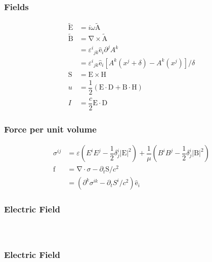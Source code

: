 \documentclass[xcolor=dvipsnames]{beamer}
\renewcommand{\c}{\cdot} %
\newcommand{\f}[2]{\dfrac{#1}{#2}} %
\newcommand{\p}[1]{\left(#1\right)} %
\renewcommand{\sp}[1]{\left[#1\right]} %
\newcommand{\abs}[1]{\left|#1\right|} %
\renewcommand{\epsilon}{\varepsilon} %
\renewcommand{\v}[1]{\boldsymbol{\mathrm{#1}}} %
\newcommand{\uv}[1]{\hat{\boldsymbol{\mathrm{#1}}}} %
\newcommand{\del}{\v\nabla} %
\renewcommand{\d}{\partial} %
\newcommand{\cxv}[1]{\v{\widetilde{#1}}} %
\begin{document}
\begin{frame}
  \frametitle{Fields}
  \begin{align*}
    \cxv E&=i\omega\cxv A \\
    \cxv B&=\del \times\cxv A \\
    &={\varepsilon^i}_{jk}\uv e_i\d^jA^k \\
    &={\varepsilon^i}_{jk}\uv
    e_i\sp{A^k\p{x^j+\delta}-A^k\p{x^j}}/\delta \\
    \v S&=\v E\times\v H \\
    u&=\f12\p{\v E\c\v D+\v B\c\v H} \\
    I&=\f c2\v E\c\v D
  \end{align*}
\end{frame}

\begin{frame}
  \frametitle{Force per unit volume}
  \begin{align*}
    \sigma^{ij}&=\epsilon\p{E^iE^j-\f12\delta^i_j\abs{\v E}^2}
    +\f1\mu\p{B^iB^j-\f12\delta^i_j\abs{\v B}^2} \\
    \v f&=\del\c\sigma-\d_t\v S/c^2 \\
    &=\p{\d^k\sigma^{ik}-\d_tS^i/c^2}\uv e_i
  \end{align*}
\end{frame}

\begin{frame}
  \frametitle{Electric Field}
  \begin{columns}[T,totalwidth=\textwidth]
    \begin{figure}[h]
      \centering
      \vspace{-.2in}
    \end{figure}

    \begin{figure}[h]
      \centering
      \vspace{-.6in}
    \end{figure}

  \end{columns}
\end{frame}

\begin{frame}
  \frametitle{Electric Field}
  \begin{figure}[h]
    \centering
  \end{figure}
\end{frame}
\end{document}
